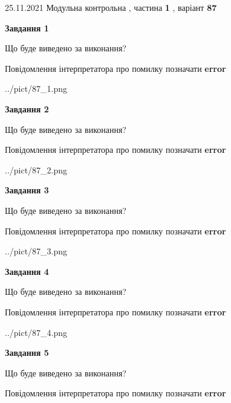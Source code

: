 \documentclass[10pt, ukrainian]{article}
\begin{document}
{25.11.2021 Модульна контрольна , частина \textbf { 1 }, варіант  \No \textbf { 87 }\par}
{
\begin {large}

{\begin {center}\textbf{Завдання 1}\end {center}}\par
Що буде виведено за виконання? \par
Повідомлення інтерпретатора про помилку позначати \textbf{error}

\begin{center}
	{../pict/87_1.png}
\end{center}
\newpage

{\begin {center}\textbf{Завдання 2}\end {center}}\par
Що буде виведено за виконання? \par
Повідомлення інтерпретатора про помилку позначати \textbf{error}

\begin{center}
	{../pict/87_2.png}
\end{center}
\newpage

{\begin {center}\textbf{Завдання 3}\end {center}}\par
Що буде виведено за виконання? \par
Повідомлення інтерпретатора про помилку позначати \textbf{error}

\begin{center}
	{../pict/87_3.png}
\end{center}
\newpage

{\begin {center}\textbf{Завдання 4}\end {center}}\par
Що буде виведено за виконання? \par
Повідомлення інтерпретатора про помилку позначати \textbf{error}

\begin{center}
	{../pict/87_4.png}
\end{center}
\newpage

{\begin {center}\textbf{Завдання 5}\end {center}}\par
Що буде виведено за виконання? \par
Повідомлення інтерпретатора про помилку позначати \textbf{error}


\end{large}}
\end{document}
